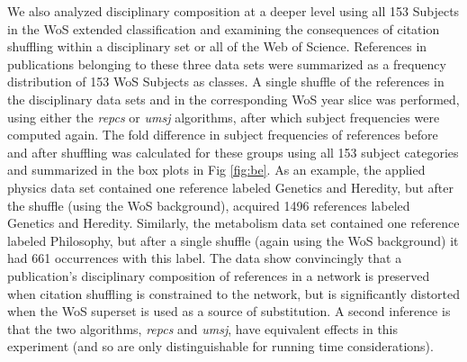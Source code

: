 \documentclass[NETN]{stjour}
\begin{document}
We also analyzed disciplinary composition at a deeper level using all 153 Subjects in the WoS extended classification and examining the consequences of  citation shuffling within a disciplinary set or all of the Web of Science.  References in publications belonging to these three data sets were summarized as a frequency distribution of 153 WoS Subjects as classes. A single shuffle of the references in the disciplinary data sets and in the corresponding WoS year slice was performed, using either the \emph{repcs}  or \emph{umsj} algorithms, after which subject frequencies were computed again. The fold difference in subject frequencies of references before and after shuffling was calculated for these groups using all 153 subject categories and summarized in the box plots in Fig \ref{fig:be}. As an example, the applied physics data set contained one reference labeled Genetics and Heredity, but after the shuffle (using the WoS background), acquired 1496 references labeled Genetics and Heredity. Similarly,  the metabolism data set  contained one reference labeled Philosophy, but after a single shuffle (again using the WoS background) it had 661 occurrences with this label. The data show convincingly that a publication's disciplinary composition of references in a network is preserved when citation shuffling is constrained to the network, but is significantly distorted when the WoS superset is used as a source of substitution. A second inference is that the two algorithms, \emph{repcs} and \emph{umsj}, have equivalent effects in this experiment (and so are only distinguishable for running time considerations).
\end{document}
